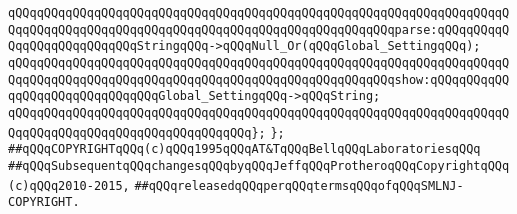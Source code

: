 \verb|qQQqqQQqqQQqqQQqqQQqqQQqqQQqqQQqqQQqqQQqqQQqqQQqqQQqqQQqqQQqqQQqqQQqqQQqqQQqqQQqqQQqqQQqqQQqqQQqqQQqqQQqqQQqqQQqqQQqqQQqqQQqparse:qQQqqQQqqQQqqQQqqQQqqQQqqQQqStringqQQq->qQQqNull_Or(qQQqGlobal_SettingqQQq);|\newline
\verb|qQQqqQQqqQQqqQQqqQQqqQQqqQQqqQQqqQQqqQQqqQQqqQQqqQQqqQQqqQQqqQQqqQQqqQQqqQQqqQQqqQQqqQQqqQQqqQQqqQQqqQQqqQQqqQQqqQQqqQQqqQQqshow:qQQqqQQqqQQqqQQqqQQqqQQqqQQqqQQqGlobal_SettingqQQq->qQQqString;|\newline
\verb|qQQqqQQqqQQqqQQqqQQqqQQqqQQqqQQqqQQqqQQqqQQqqQQqqQQqqQQqqQQqqQQqqQQqqQQqqQQqqQQqqQQqqQQqqQQqqQQqqQQqqQQq};|\newline
\newline
\verb|};|\newline
\newline
\newline
\verb|##qQQqCOPYRIGHTqQQq(c)qQQq1995qQQqAT&TqQQqBellqQQqLaboratoriesqQQq|\newline
\verb|##qQQqSubsequentqQQqchangesqQQqbyqQQqJeffqQQqProtheroqQQqCopyrightqQQq(c)qQQq2010-2015,|\newline
\verb|##qQQqreleasedqQQqperqQQqtermsqQQqofqQQqSMLNJ-COPYRIGHT.|\newline

